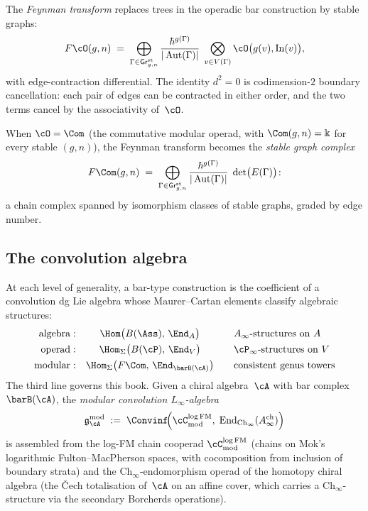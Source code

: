 The \emph{Feynman transform} replaces trees in the
operadic bar construction by stable graphs:
\begin{equation}\label{eq:preface-feynman-sum}
F\cO(g,n)
\;=\;
\bigoplus_{\Gamma\in\mathsf{Gr}^{\mathrm{st}}_{g,n}}
\frac{\hbar^{g(\Gamma)}}{|\operatorname{Aut}(\Gamma)|}
\;\bigotimes_{v\in V(\Gamma)}\cO\bigl(g(v),\mathrm{In}(v)\bigr),
\end{equation}
with edge-contraction differential. The identity $d^2=0$ is
codimension-$2$ boundary cancellation: each pair of edges can be
contracted in either order, and the two terms cancel by the
associativity of~$\cO$.

When $\cO=\Com$ (the commutative modular operad, with
$\Com(g,n)=\Bbbk$ for every stable $(g,n)$), the Feynman
transform becomes the \emph{stable graph complex}
\[
F\Com(g,n)
\;=\;
\bigoplus_{\Gamma\in\mathsf{Gr}^{\mathrm{st}}_{g,n}}
\frac{\hbar^{g(\Gamma)}}{|\operatorname{Aut}(\Gamma)|}
\;\det\bigl(E(\Gamma)\bigr)\!:
\]
a chain complex spanned by isomorphism classes of stable graphs,
graded by edge number.

\subsection*{The convolution algebra}

At each level of generality, a bar-type construction is the
coefficient of a convolution dg Lie algebra whose Maurer--Cartan
elements classify algebraic structures:
\begin{equation}\label{eq:preface-convolution-ladder}
\begin{array}{r@{\;:\quad}c@{\qquad}l}
\text{algebra} &
 \Hom\bigl(B(\Ass),\,\End_A\bigr)
 & A_\infty\text{-structures on }A \\[4pt]
\text{operad} &
 \Hom_\Sigma\bigl(B(\cP),\,\End_V\bigr)
 & \cP_\infty\text{-structures on }V \\[4pt]
\text{modular} &
 \Hom_\Sigma\bigl(F\Com,\,\End_{\barB(\cA)}\bigr)
 & \text{consistent genus towers}
\end{array}
\end{equation}
The third line governs this book. Given a chiral algebra~$\cA$
with bar complex~$\barB(\cA)$, the \emph{modular convolution
$L_\infty$-algebra}
\begin{equation}\label{eq:pref-convolution}
\mathfrak g^{\mathrm{mod}}_\cA
\;:=\;
\Convinf\!\Bigl(
\cC^{\log\mathrm{FM}}_{\mathrm{mod}},\;
\mathrm{End}_{\mathrm{Ch}_\infty}(A^{\mathrm{ch}}_\infty)
\Bigr)
\end{equation}
is assembled from the log-FM chain cooperad
$\cC^{\log\mathrm{FM}}_{\mathrm{mod}}$
(chains on Mok's logarithmic Fulton--MacPherson spaces, with
cocomposition from inclusion of boundary strata) and the
$\mathrm{Ch}_\infty$-endomorphism operad of the homotopy chiral
algebra (the \v{C}ech totalisation of~$\cA$ on an affine cover,
which carries a $\mathrm{Ch}_\infty$-structure via the secondary
Borcherds operations).

